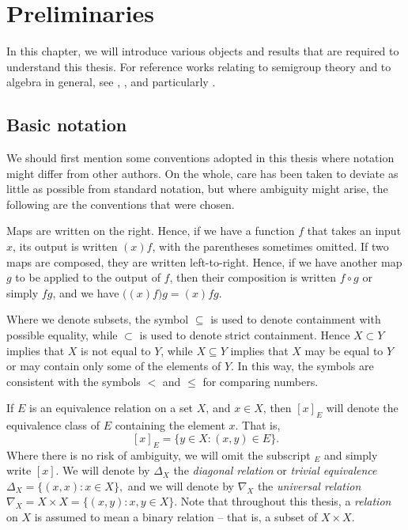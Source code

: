 \chapter{Preliminaries}
\label{chap:intro}

In this chapter, we will introduce various objects and results that are required
to understand this thesis.  For reference works relating to semigroup theory and
to algebra in general, see \cite{warner}, \cite{petrich}, and particularly
\cite{howie}.

\section{Basic notation}
\label{sec:intro-notation}

We should first mention some conventions adopted in this thesis where notation
might differ from other authors.  On the whole, care has been taken to deviate
as little as possible from standard notation, but where ambiguity might arise,
the following are the conventions that were chosen.

Maps are written on the right.  Hence, if we have a function $f$ that takes an
input $x$, its output is written $(x)f$, with the parentheses sometimes omitted.
If two maps are composed, they are written left-to-right.  Hence, if we have
another map $g$ to be applied to the output of $f$, then their composition is
written $f \circ g$ or simply $fg$, and we have
$\big((x)f\big)g = (x)fg.$

Where we denote subsets, the symbol $\subseteq$ is used to denote containment
with possible equality, while $\subset$ is used to denote strict containment.
Hence $X \subset Y$ implies that $X$ is not equal to $Y$, while $X \subseteq Y$
implies that $X$ may be equal to $Y$ or may contain only some of the elements of
$Y$.  In this way, the symbols are consistent with the symbols $<$ and $\leq$ for
comparing numbers.

If $E$ is an equivalence relation on a set $X$, and $x \in X$, then $[x]_E$ will
denote the equivalence class of $E$ containing the element $x$.  That is,
$$[x]_E = \{y \in X : (x,y) \in E\}.$$
Where there is no risk of ambiguity, we will omit the subscript $_E$ and simply
write $[x]$.  We will denote by $\Delta_X$ the \textit{diagonal relation} or
\textit{trivial equivalence}
$\Delta_X = \{(x,x): x \in X\},$
and we will denote by $\nabla_X$ the \textit{universal relation}
$\nabla_X = X \times X = \{(x,y): x,y \in X\}.$
Note that throughout this thesis, a \textit{relation} on $X$ is assumed to mean
a binary relation -- that is, a subset of $X \times X$.


